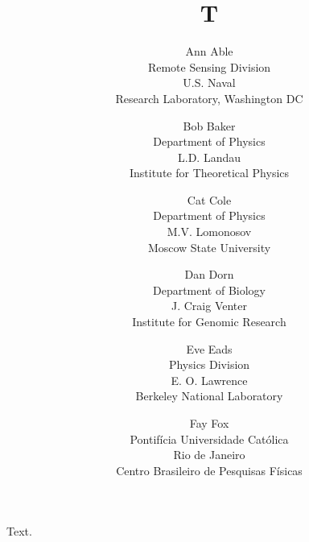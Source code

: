 \documentclass{article}
\title{T}
\author{Ann Able \\
Remote Sensing Division \\
U.S. Naval \\
Research Laboratory, Washington DC
\and Bob Baker \\
Department of Physics \\
L.D. Landau \\
Institute for Theoretical Physics
\and Cat Cole \\
Department of Physics \\
M.V. Lomonosov \\
Moscow State University
\and Dan Dorn \\
Department of Biology \\
J. Craig Venter \\
Institute for Genomic Research
\and Eve Eads \\
Physics Division \\
E. O. Lawrence \\
Berkeley National Laboratory
\and Fay Fox \\
Pontif\'icia Universidade Cat\'olica \\
Rio de Janeiro \\
Centro Brasileiro de Pesquisas F\'isicas}
\begin{document}
\maketitle
Text.
\end{document}
